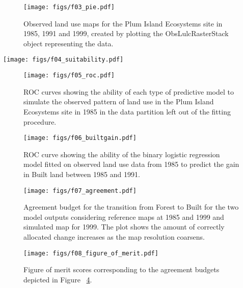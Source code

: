 \documentclass{icldt}\usepackage[]{graphicx}\usepackage[]{color}
\begin{document}
\begin{figure}[h]
  \texttt{[image: figs/f03\_pie.pdf]}
  \caption{Observed land use maps for the Plum Island Ecosystems site in 1985, 1991 and 1999, created by plotting the ObsLulcRasterStack object representing the data.}
  \label{fig:pie}
\end{figure}

\begin{figure*}[t]
  \texttt{[image: figs/f04\_suitability.pdf]}
  \caption{Suitability of pixels in the Plum Island Ecosystems study site to belong to Forest, Built and Other land use classes according to binary logistic regression models. Elevation and slope are used as explanatory variables for all land uses while Built additionally includes distance to built pixels in 1985.}
  \label{fig:suitability}
\end{figure*}

\begin{figure}[t]
  \texttt{[image: figs/f05\_roc.pdf]}
  \caption{ROC curves showing the ability of each type of predictive model to simulate the observed pattern of land use in the Plum Island Ecosystems site in 1985 in the data partition left out of the fitting procedure.}
  \label{fig:roc}
\end{figure}

\begin{figure}[t]
  \texttt{[image: figs/f06\_builtgain.pdf]}
  \caption{ROC curve showing the ability of the binary logistic regression model fitted on observed land use data from 1985 to predict the gain in Built land between 1985 and 1991.}
  \label{fig:builtgain}
\end{figure}

\begin{figure}[t]
  \texttt{[image: figs/f07\_agreement.pdf]}
  \caption{Agreement budget for the transition from Forest to Built for the two model outputs considering reference maps at 1985 and 1999 and simulated map for 1999. The plot shows the amount of correctly allocated change increases as the map resolution coarsens.}
  \label{fig:agreement}
\end{figure}

\begin{figure}[t]
  \texttt{[image: figs/f08\_figure\_of\_merit.pdf]}
  \caption{Figure of merit scores corresponding to the agreement budgets depicted in Figure ~\ref{fig:agreement}.}
  \label{fig:fom}
\end{figure}
\end{document}
